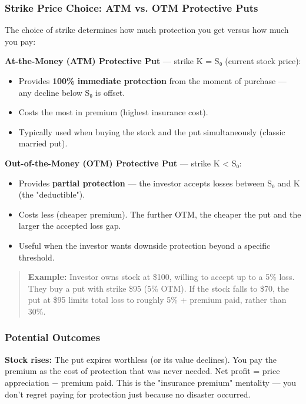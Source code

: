 \documentclass[12pt,openany]{book}
\begin{document}
\subsubsection{Strike Price Choice: ATM vs. OTM Protective Puts}

The choice of strike determines how much protection you get versus how much you pay:

\textbf{At-the-Money (ATM) Protective Put} — strike K = S₀ (current stock price):
\begin{itemize}[leftmargin=*]
    \item Provides \textbf{100\% immediate protection} from the moment of purchase — any decline below S₀ is offset.
    \item Costs the most in premium (highest insurance cost).
    \item Typically used when buying the stock and the put simultaneously (classic married put).
\end{itemize}

\textbf{Out-of-the-Money (OTM) Protective Put} — strike K < S₀:
\begin{itemize}[leftmargin=*]
    \item Provides \textbf{partial protection} — the investor accepts losses between S₀ and K (the "deductible").
    \item Costs less (cheaper premium). The further OTM, the cheaper the put and the larger the accepted loss gap.
    \item Useful when the investor wants downside protection beyond a specific threshold.
\end{itemize}

\begin{quote}
\textbf{Example:} Investor owns stock at \$100, willing to accept up to a 5\% loss. They buy a put with strike \$95 (5\% OTM). If the stock falls to \$70, the put at \$95 limits total loss to roughly 5\% + premium paid, rather than 30\%.
\end{quote}



\subsubsection{Potential Outcomes}

\textbf{Stock rises:} The put expires worthless (or its value declines). You pay the premium as the cost of protection that was never needed. Net profit = price appreciation − premium paid. This is the "insurance premium" mentality — you don't regret paying for protection just because no disaster occurred.
\end{document}
